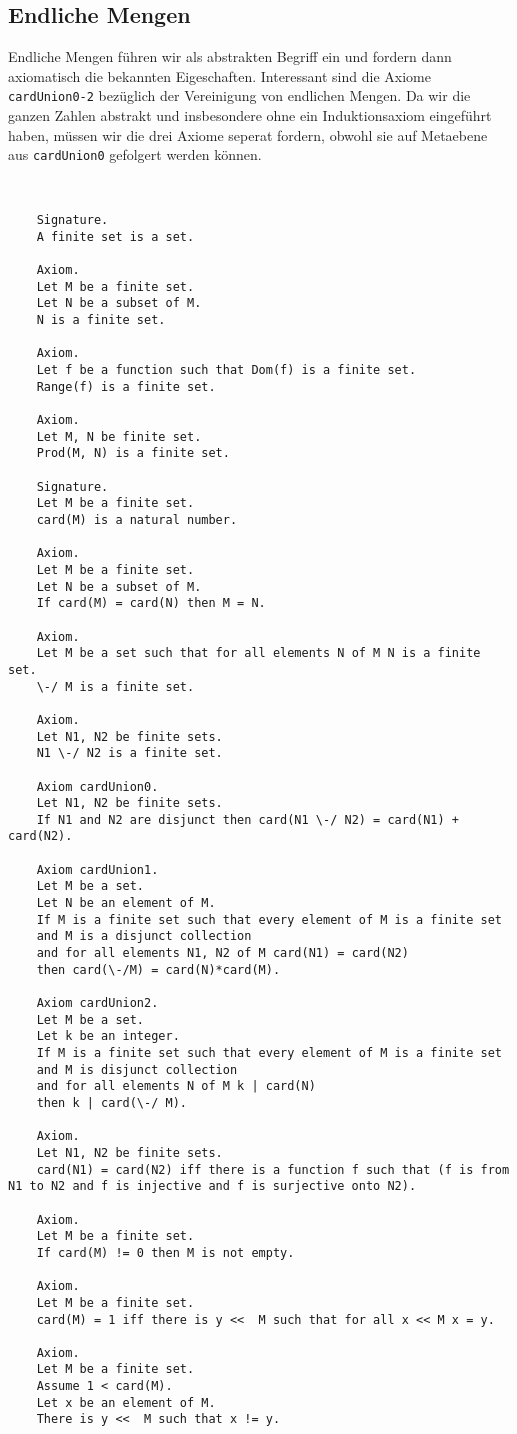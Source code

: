 \documentclass[a4paper,12pt]{scrartcl}
\begin{document}
\subsection{Endliche Mengen}

Endliche Mengen führen wir als abstrakten Begriff ein und fordern dann axiomatisch die bekannten Eigeschaften. Interessant sind die Axiome \verb!cardUnion0-2! bezüglich der Vereinigung von endlichen Mengen. Da wir die ganzen Zahlen abstrakt und insbesondere ohne ein Induktionsaxiom eingeführt haben, müssen wir die drei Axiome seperat fordern, obwohl sie auf Metaebene aus \verb!cardUnion0! gefolgert werden können.

\begin{lstlisting}


	Signature.
	A finite set is a set.
	
	Axiom.
	Let M be a finite set.
	Let N be a subset of M.
	N is a finite set.
	
	Axiom.
	Let f be a function such that Dom(f) is a finite set.
	Range(f) is a finite set.
	
	Axiom.
	Let M, N be finite set.
	Prod(M, N) is a finite set.
	
	Signature.
	Let M be a finite set.
	card(M) is a natural number.
	
	Axiom.
	Let M be a finite set.
	Let N be a subset of M.
	If card(M) = card(N) then M = N.
	
	Axiom.
	Let M be a set such that for all elements N of M N is a finite set.
	\-/ M is a finite set.
	
	Axiom.
	Let N1, N2 be finite sets.
	N1 \-/ N2 is a finite set.
	
	Axiom cardUnion0.
	Let N1, N2 be finite sets.
	If N1 and N2 are disjunct then card(N1 \-/ N2) = card(N1) + card(N2).
	
	Axiom cardUnion1.
	Let M be a set.
	Let N be an element of M.
	If M is a finite set such that every element of M is a finite set
	and M is a disjunct collection 
	and for all elements N1, N2 of M card(N1) = card(N2)
	then card(\-/M) = card(N)*card(M).
	
	Axiom cardUnion2.
	Let M be a set.
	Let k be an integer.
	If M is a finite set such that every element of M is a finite set
	and M is disjunct collection
	and for all elements N of M k | card(N)
	then k | card(\-/ M).
	
	Axiom.
	Let N1, N2 be finite sets.
	card(N1) = card(N2) iff there is a function f such that (f is from N1 to N2 and f is injective and f is surjective onto N2).
	
	Axiom.
	Let M be a finite set.
	If card(M) != 0 then M is not empty.
	
	Axiom.
	Let M be a finite set.
	card(M) = 1 iff there is y <<  M such that for all x << M x = y.
	
	Axiom.
	Let M be a finite set.
	Assume 1 < card(M).
	Let x be an element of M.
	There is y <<  M such that x != y.

\end{lstlisting}
\end{document}
